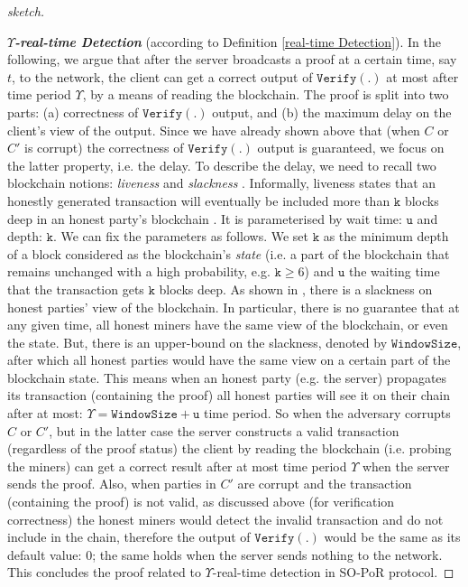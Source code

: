 \begin{proof}[sketch]
\

\noindent\textbf{\textit{$\Upsilon$-real-time Detection}} (according to Definition \ref{real-time Detection}). In the following, we argue that after the server broadcasts a proof at a certain time, say $t$, to the network, the client can get a correct output of $\mathtt{Verify}(.)$ at most after time period $\Upsilon$, by a means of  reading the blockchain. The proof  is split into two parts: (a) correctness of $\mathtt{Verify}(.)$ output, and (b) the maximum delay on the client's view of the output. Since we have already shown above that (when $C$ or $C'$ is corrupt) the correctness of $\mathtt{Verify}(.)$  output is guaranteed,  we focus on the latter property, i.e. the delay. To describe the delay, we need to recall two blockchain notions: \emph{liveness} and \emph{slackness} \cite{DBLP:conf/crypto/GarayKL17,DBLP:conf/crypto/BadertscherMTZ17}. Informally, liveness states that an honestly generated transaction  will eventually be included more than $\mathtt{k}$ blocks deep in an honest party's  blockchain \cite{DBLP:conf/crypto/GarayKL17}. It is parameterised by wait time: $\mathtt{u}$ and depth: $\mathtt{k}$. We can fix the parameters as follows. We set $\mathtt{k}$ as the minimum depth of a block  considered as the blockchain's \emph{state}  (i.e. a part of the blockchain that remains unchanged with a high probability, e.g. $\mathtt{k}\geq 6$) and $\mathtt{u}$ the waiting time  that the transaction gets $\mathtt{k}$ blocks deep. As shown in \cite{DBLP:conf/crypto/BadertscherMTZ17}, there is a slackness on  honest parties' view of the blockchain.  In particular, there is no guarantee that at any given time, all honest miners have the same view of the blockchain, or even the  state. But, there is an upper-bound on the slackness,  denoted by $\mathtt{WindowSize}$, after which all honest parties would have the same view on a certain part of the blockchain state. This means when an honest party (e.g. the server) propagates its transaction (containing the proof) all honest parties will see it on their chain after at most: $\Upsilon=\mathtt{WindowSize}+\mathtt{u}$ time period. So when  the adversary corrupts $C$ or $C'$, but in the latter case the server constructs a valid transaction (regardless of the proof status) the client by reading the blockchain (i.e. probing the miners) can get a correct result after at most time period $\Upsilon$ when the server sends the proof. Also, when parties in $C'$ are corrupt and the transaction (containing the proof) is not valid,  as discussed above  (for verification correctness) the honest miners would detect the invalid transaction and do not include in the chain, therefore the output of $\mathtt{Verify(.)}$ would be the same as its default value: $0$; the same holds  when the server sends nothing to the network. This concludes the proof related to $\Upsilon$-real-time detection in SO-PoR protocol.



\end{proof}
